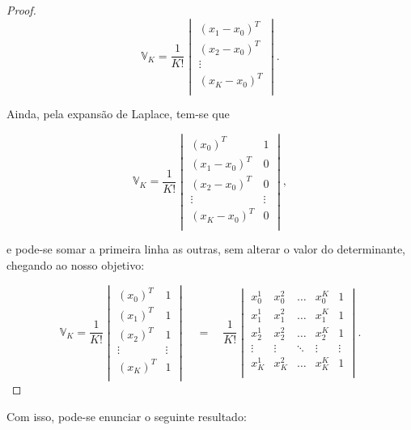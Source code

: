 \begin{lema}
\begin{proof}
		$$\mathbb{V}_K = \frac{1}{K!}\begin{vmatrix}
			(x_1-x_0)^T \\
			(x_2-x_0)^T \\
			\vdots \\
			(x_K-x_0)^T \\
		\end{vmatrix}.$$
		
		\noindent Ainda, pela expansão de Laplace, tem-se que
		
		$$\mathbb{V}_K = \frac{1}{K!}\begin{vmatrix}
			(x_0)^T & 1\\
			(x_1-x_0)^T & 0\\
			(x_2-x_0)^T & 0\\
			\vdots & \vdots\\
			(x_K-x_0)^T & 0\\
		\end{vmatrix},$$
		
		\noindent e pode-se somar a primeira linha as outras, sem alterar o valor do determinante, chegando ao nosso objetivo:
		
		$$\mathbb{V}_K = \frac{1}{K!}\begin{vmatrix}
			(x_0)^T & 1\\
			(x_1)^T & 1\\
			(x_2)^T & 1\\
			\vdots & \vdots\\
			(x_K)^T & 1\\
		\end{vmatrix} \quad = \quad \frac{1}{K!} 
		\begin{vmatrix}
			x_0^1 & x^2_{0} & \ldots & x^K_{0} & 1\\ 
			x^1_{1} & x^2_1 & \ldots & x^K_{1} & 1\\ 
			x^1_{2} & x^2_2 & \ldots & x^K_{2} & 1\\ 
			\vdots & \vdots & \ddots & \vdots & \vdots\\ 
			x^1_{K} & x^2_{K} & \ldots & x_K^K & 1\\ 
		\end{vmatrix}.$$
	\end{proof}
\end{lema}

Com isso, pode-se enunciar o seguinte resultado:

